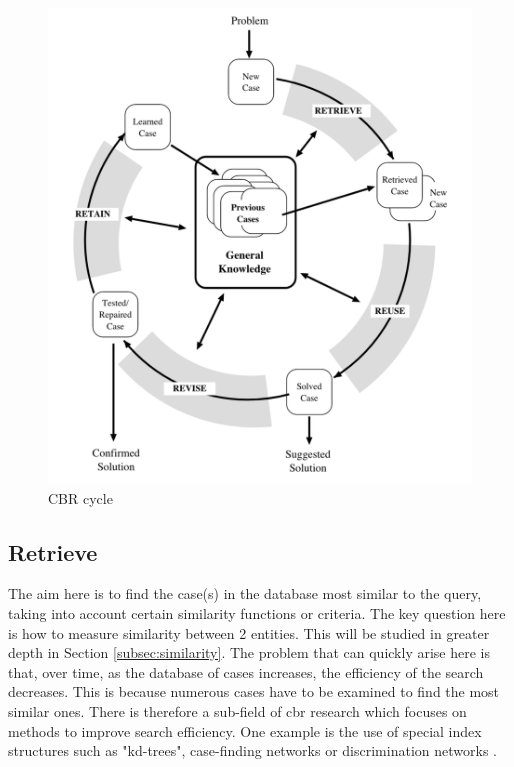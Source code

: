     \begin{figure}[h]
    \centering
    \includegraphics[scale=0.6]{images/Concept-cbr-cycle.png}
    \caption{\label{fig:cbr-cycle}  CBR cycle \cite{cbrIntroRecent}}
    \end{figure}
    

    \subsection{Retrieve}
    The aim here is to find the case(s) in the database most similar to the query, taking into account certain similarity functions or criteria. The key question here is how to measure similarity between 2 entities. This will be studied in greater depth in Section \ref{subsec:similarity}. The problem that can quickly arise here is that, over time, as the database of cases increases, the efficiency of the search decreases. This is because numerous cases have to be examined to find the most similar ones. There is therefore a sub-field of \acrshort{cbr} research which focuses on methods to improve search efficiency. One example is the use of special index structures such as "kd-trees", case-finding networks or discrimination networks \cite{cbrIntroRecent}.
    
